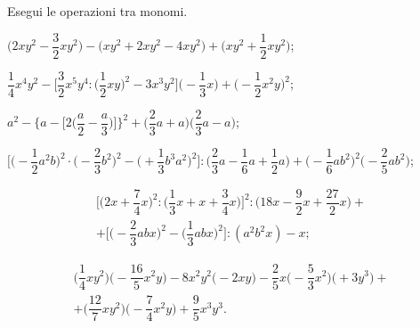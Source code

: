 \begin{esercizio}[\Ast]
 \label{ese:9.35}
Esegui le operazioni tra monomi.

\begin{enumeratea}
 \item $\bigg(2xy^{2}-\dfrac{3}{2}xy^{2}\bigg)-\big(xy^{2}+2xy^{2}-4xy^{2}\big)+\bigg(xy^{2}+\dfrac{1}{2}xy^{2}\bigg)$;
 \item $\dfrac{1}{4}x^{4}y^{2}-\bigg[\dfrac{3}{2}x^{5}y^{4}:\bigg(\dfrac{1}{2}xy\bigg)^{2}-3x^{3}y^{2}\bigg]%
 \bigg(-{\dfrac{1}{3}}x\bigg)+\bigg(-{\dfrac{1}{2}}x^{2}y\bigg)^{2}$;
 \item $a^{2}-\Bigg\{a-\bigg[2\bigg(\dfrac{a}{2}-\dfrac{a}{3}\bigg)\bigg]\Bigg\}^{2}+%
 \bigg(\dfrac{2}{3}a+a\bigg)\bigg(\dfrac{2}{3}a-a\bigg)$;
 \item $\bigg[\bigg(-{\dfrac{1}{2}}a^{2}b\bigg)^{2}\cdot\bigg(-{\dfrac{2}{3}}b^{2}\bigg)^{2}-%
 \bigg(+{\dfrac{1}{3}}b^{3}a^{2}\bigg)^{2}\bigg]:\bigg(\dfrac{2}{3}a-\dfrac{1}{6}a+\dfrac{1}{2}a\bigg)+\bigg(-{\dfrac{1}{6}}ab^{2}\bigg)^2%
 \bigg(-{\dfrac{2}{5}}ab^2\bigg)$;
 \item \begin{multline*}
 \Bigg[\bigg(2x+\dfrac{7}{4}x\bigg)^{2}:\bigg(\dfrac{1}{3}x+x+\dfrac{3}{4}x\bigg)\Bigg]^{2}%
:\bigg(18x-\dfrac{9}{2}x+\dfrac{27}{2}x\bigg)+\\
 +\bigg[\bigg(-{\dfrac{2}{3}}abx\bigg)^{2}-\bigg(\dfrac{1}{3}abx\bigg)^{2}\bigg]:(a^{2}b^{2}x)-x;
 \end{multline*}
 \item \begin{multline*}
 \bigg(\dfrac{1}{4}xy^{2}\bigg)\bigg(-{\dfrac{16}{5}}x^{2}y\bigg)-8x^{2}y^{2}\bigg(-2xy\bigg)%
 -\dfrac{2}{5}x\bigg(-{\dfrac{5}{3}}x^{2}\bigg)\bigg(+3y^{3}\bigg)+\\
 +\bigg(\dfrac{12}{7}xy^{2}\bigg)\bigg(-{\dfrac{7}{4}}x^{2}y\bigg)+\dfrac{9}{5}x^{3}y^{3}.
 \end{multline*}
\end{enumeratea}
\end{esercizio}



